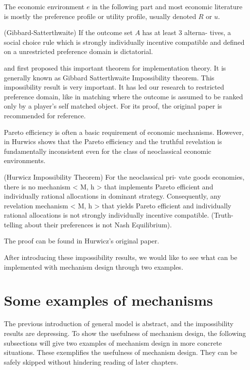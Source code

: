The economic environment $e$ in the following part and most economic literature is mostly the preference profile or utility profile, usually denoted $R$ or $u$.

\begin{thm*}(Gibbard-Satterthwaite)
  \label{gibbard-satterthwaite}
If the outcome set $A$ has at least 3 alterna-
tives, a social choice rule which is strongly individually incentive compatible and
defined on a unrestricted preference domain is dictatorial.
\end{thm*}

\parencite{Gibbard1973} and \parencite{Satterthwaite1975} first proposed this important theorem for implementation theory. It is generally known as 
Gibbard Satterthwaite Impossibility theorem. This impossibility result is very important. It has led our research to restricted preference domain, like in matching where the outcome is assumed to be ranked only by a player's self matched object. For its proof, the original paper is recommended for reference.

Pareto efficiency is often a basic requirement of economic
mechanisms. However, in \parencite{Hurwicz1972}
Hurwics  shows that  the Pareto efficiency and the truthful revelation is
fundamentally inconsistent even for the class of neoclassical economic
environments.
\begin{thm*}
(Hurwicz Impossibility Theorem) For the neoclassical pri-
vate goods economies, there is no mechanism < M, h > that implements Pareto efficient
and individually rational allocations in dominant strategy. Consequently, any revelation
mechanism < M, h > that yields Pareto efficient and individually rational allocations is
not strongly individually incentive compatible. (Truth-telling about their preferences is not
Nash Equilibrium).
\end{thm*}
The proof can be found in Hurwicz's original paper. 

After introducing these impossibility results, we would like to see what can be implemented with mechanism design through two examples.

\section{Some examples of  mechanisms}

The previous introduction of general model is abstract, and the impossibility results are depressing. To show the usefulness of mechanism design, the following subsections will give two examples of mechanism design in more concrete situations. These exemplifies the usefulness of mechanism design. They can be safely skipped without hindering reading of later chapters. 

